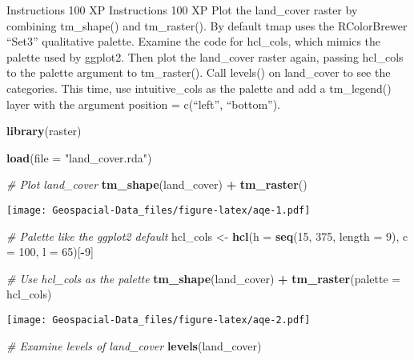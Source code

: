 \documentclass[]{article}
\newenvironment{Shaded}{\begin{snugshade}}{\end{snugshade}}
\newcommand{\CommentTok}[1]{\textcolor[rgb]{0.56,0.35,0.01}{\textit{#1}}}
\newcommand{\DataTypeTok}[1]{\textcolor[rgb]{0.13,0.29,0.53}{#1}}
\newcommand{\DecValTok}[1]{\textcolor[rgb]{0.00,0.00,0.81}{#1}}
\newcommand{\KeywordTok}[1]{\textcolor[rgb]{0.13,0.29,0.53}{\textbf{#1}}}
\newcommand{\NormalTok}[1]{#1}
\newcommand{\OperatorTok}[1]{\textcolor[rgb]{0.81,0.36,0.00}{\textbf{#1}}}
\newcommand{\StringTok}[1]{\textcolor[rgb]{0.31,0.60,0.02}{#1}}
\begin{document}
Instructions 100 XP Instructions 100 XP Plot the land\_cover raster by
combining tm\_shape() and tm\_raster(). By default tmap uses the
RColorBrewer ``Set3'' qualitative palette. Examine the code for
hcl\_cols, which mimics the palette used by ggplot2. Then plot the
land\_cover raster again, passing hcl\_cols to the palette argument to
tm\_raster(). Call levels() on land\_cover to see the categories. This
time, use intuitive\_cols as the palette and add a tm\_legend() layer
with the argument position = c(``left'', ``bottom'').

\begin{Shaded}
\begin{Highlighting}[]
\KeywordTok{library}\NormalTok{(raster)}

\KeywordTok{load}\NormalTok{(}\DataTypeTok{file =} \StringTok{"land_cover.rda"}\NormalTok{)}

\CommentTok{# Plot land_cover}
\KeywordTok{tm_shape}\NormalTok{(land_cover) }\OperatorTok{+}
\StringTok{  }\KeywordTok{tm_raster}\NormalTok{() }
\end{Highlighting}
\end{Shaded}

\texttt{[image: Geospacial-Data\_files/figure-latex/aqe-1.pdf]}

\begin{Shaded}
\begin{Highlighting}[]
\CommentTok{# Palette like the ggplot2 default}
\NormalTok{hcl_cols <-}\StringTok{ }\KeywordTok{hcl}\NormalTok{(}\DataTypeTok{h =} \KeywordTok{seq}\NormalTok{(}\DecValTok{15}\NormalTok{, }\DecValTok{375}\NormalTok{, }\DataTypeTok{length =} \DecValTok{9}\NormalTok{), }
                \DataTypeTok{c =} \DecValTok{100}\NormalTok{, }\DataTypeTok{l =} \DecValTok{65}\NormalTok{)[}\OperatorTok{-}\DecValTok{9}\NormalTok{]}

\CommentTok{# Use hcl_cols as the palette}
\KeywordTok{tm_shape}\NormalTok{(land_cover) }\OperatorTok{+}
\StringTok{  }\KeywordTok{tm_raster}\NormalTok{(}\DataTypeTok{palette =}\NormalTok{ hcl_cols) }
\end{Highlighting}
\end{Shaded}

\texttt{[image: Geospacial-Data\_files/figure-latex/aqe-2.pdf]}

\begin{Shaded}
\begin{Highlighting}[]
\CommentTok{# Examine levels of land_cover}
\KeywordTok{levels}\NormalTok{(land_cover)}
\end{Highlighting}
\end{Shaded}
\end{document}
